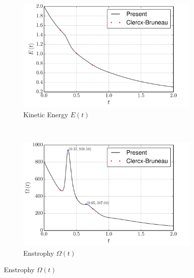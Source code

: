 	\begin{figure}[p]
     \centering
     \begin{subfigure}[t]{0.49\textwidth}
             \includegraphics[width=\textwidth]{figures/eulerian/dipole_KineticEnergy_comparison.pdf}
             \caption{Kinetic Energy $E(t)$}
             \label{fig:dipole_KineticEnergy_comparison}
     \end{subfigure}%
     ~ %
     \begin{subfigure}[t]{0.49\textwidth}
             \includegraphics[width=\textwidth]{figures/eulerian/dipole_Enstrophy_comparison.pdf}
             \caption{Enstrophy $\Omega(t)$}
             \label{fig:dipole_Enstrophy_comparison}
     \end{subfigure}
     

\end{figure}

